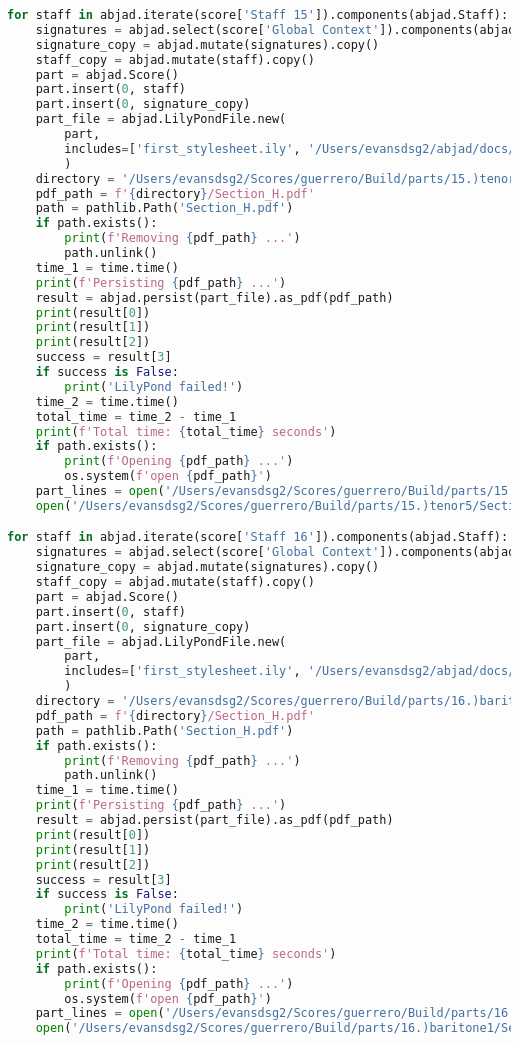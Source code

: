 \begin{lstlisting}[language=Python, caption=Invocation Source Code]
for staff in abjad.iterate(score['Staff 15']).components(abjad.Staff):
    signatures = abjad.select(score['Global Context']).components(abjad.Staff)
    signature_copy = abjad.mutate(signatures).copy()
    staff_copy = abjad.mutate(staff).copy()
    part = abjad.Score()
    part.insert(0, staff)
    part.insert(0, signature_copy)
    part_file = abjad.LilyPondFile.new(
        part,
        includes=['first_stylesheet.ily', '/Users/evansdsg2/abjad/docs/source/_stylesheets/abjad.ily'],
        )
    directory = '/Users/evansdsg2/Scores/guerrero/Build/parts/15.)tenor5'
    pdf_path = f'{directory}/Section_H.pdf'
    path = pathlib.Path('Section_H.pdf')
    if path.exists():
        print(f'Removing {pdf_path} ...')
        path.unlink()
    time_1 = time.time()
    print(f'Persisting {pdf_path} ...')
    result = abjad.persist(part_file).as_pdf(pdf_path)
    print(result[0])
    print(result[1])
    print(result[2])
    success = result[3]
    if success is False:
        print('LilyPond failed!')
    time_2 = time.time()
    total_time = time_2 - time_1
    print(f'Total time: {total_time} seconds')
    if path.exists():
        print(f'Opening {pdf_path} ...')
        os.system(f'open {pdf_path}')
    part_lines = open('/Users/evansdsg2/Scores/guerrero/Build/parts/15.)tenor5/Section_H.ly').readlines()
    open('/Users/evansdsg2/Scores/guerrero/Build/parts/15.)tenor5/Section_H.ly', 'w').writelines(part_lines[15:-1])

for staff in abjad.iterate(score['Staff 16']).components(abjad.Staff):
    signatures = abjad.select(score['Global Context']).components(abjad.Staff)
    signature_copy = abjad.mutate(signatures).copy()
    staff_copy = abjad.mutate(staff).copy()
    part = abjad.Score()
    part.insert(0, staff)
    part.insert(0, signature_copy)
    part_file = abjad.LilyPondFile.new(
        part,
        includes=['first_stylesheet.ily', '/Users/evansdsg2/abjad/docs/source/_stylesheets/abjad.ily'],
        )
    directory = '/Users/evansdsg2/Scores/guerrero/Build/parts/16.)baritone1'
    pdf_path = f'{directory}/Section_H.pdf'
    path = pathlib.Path('Section_H.pdf')
    if path.exists():
        print(f'Removing {pdf_path} ...')
        path.unlink()
    time_1 = time.time()
    print(f'Persisting {pdf_path} ...')
    result = abjad.persist(part_file).as_pdf(pdf_path)
    print(result[0])
    print(result[1])
    print(result[2])
    success = result[3]
    if success is False:
        print('LilyPond failed!')
    time_2 = time.time()
    total_time = time_2 - time_1
    print(f'Total time: {total_time} seconds')
    if path.exists():
        print(f'Opening {pdf_path} ...')
        os.system(f'open {pdf_path}')
    part_lines = open('/Users/evansdsg2/Scores/guerrero/Build/parts/16.)baritone1/Section_H.ly').readlines()
    open('/Users/evansdsg2/Scores/guerrero/Build/parts/16.)baritone1/Section_H.ly', 'w').writelines(part_lines[15:-1])


\end{lstlisting}
